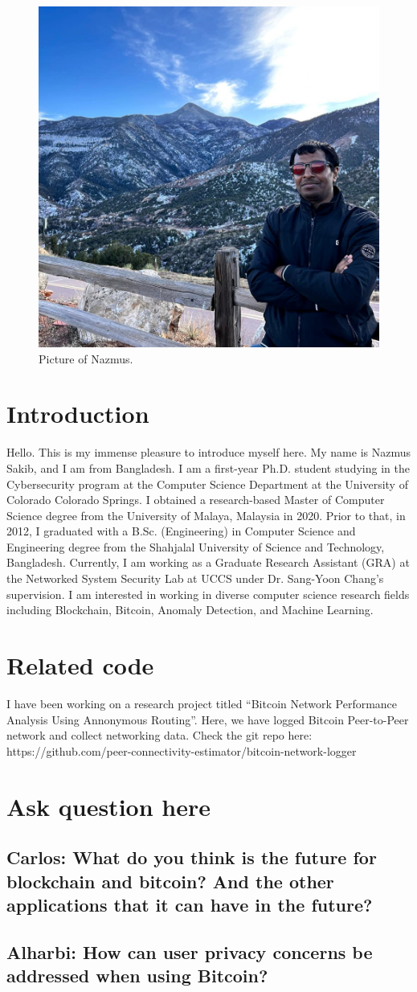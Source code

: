 

\begin{figure}[h!]
\centering
\includegraphics[width=.5\columnwidth]{picture-nazmus.jpg}
\caption{Picture of Nazmus.}
\label{fig:my-picture}
\end{figure}

\section{Introduction}

Hello. This is my immense pleasure to introduce myself here. My name is Nazmus Sakib, and I am from Bangladesh. I am a first-year Ph.D. student studying in the Cybersecurity program at the Computer Science Department at the University of Colorado Colorado Springs. I obtained a research-based Master of Computer Science degree from the University of Malaya, Malaysia in 2020. Prior to that, in 2012, I graduated with a B.Sc. (Engineering) in Computer Science and Engineering degree from the Shahjalal University of Science and Technology, Bangladesh. Currently, I am working as a Graduate Research Assistant (GRA) at the Networked System Security Lab at UCCS under Dr. Sang-Yoon Chang's supervision. I am interested in working in diverse computer science research fields including Blockchain, Bitcoin, Anomaly Detection, and Machine Learning.

\section{Related code}

I have been working on a research project titled ``Bitcoin Network Performance Analysis Using Annonymous Routing''. Here, we have logged Bitcoin Peer-to-Peer network and collect networking data.
Check the git repo here: https://github.com/peer-connectivity-estimator/bitcoin-network-logger

\section{Ask question here}

\subsection{Carlos: What do you think is the future for blockchain and bitcoin? And the other applications that it can have in the future?}

\subsection{Alharbi: How can user privacy concerns be addressed when using Bitcoin?}